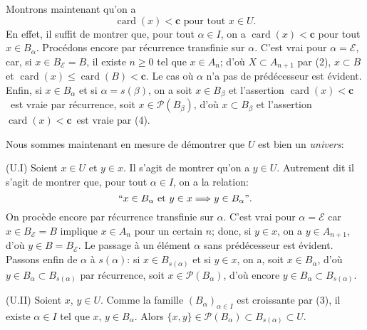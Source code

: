 \documentclass[12pt]{article}
\newcommand{\card}{\operatorname{card}}
\begin{document}
Montrons maintenant qu'on a
\begin{equation*}
\card(x) < \mathbf c\text{ pour tout } x\in U.\tag{5}
\end{equation*}
En effet, il suffit de montrer que, pour tout $\alpha\in I$, on a \og$\card(x) < \mathbf c$ pour tout $x\in B_{\alpha}$\fg. Procédons encore par récurrence transfinie sur $\alpha$. C'est vrai pour $\alpha=\mathcal{E}$, car, si $x\in B_{\mathcal{E}}=B$, il existe $n\geq 0$ tel que $x\in A_n$; d'où $X \subset A_{n+1}$ par (2), $x\subset B$ et $\card(x) \leq \card(B) < \mathbf c$. Le cas où $\alpha$ n'a pas de prédécesseur est évident. Enfin, si $x\in B_{\alpha}$ et si $\alpha=s(\beta)$, on a soit $x\in B_{\beta}$ et l'assertion \og$\card(x) < \mathbf c$\fg\ est vraie par récurrence, soit $x\in\mathcal{P}(B_{\beta})$, d'où $x\subset B_{\beta}$ et l'assertion \og$\card(x) < \mathbf c$\fg\ est vraie par (4).

Nous sommes maintenant en mesure de démontrer que $U$ est bien un \emph{univers}:

(U.I) Soient $x\in U$ et $y\in x$. Il s'agit de montrer qu'on a $y\in U$. Autrement dit il s'agit de montrer que, pour tout $\alpha\in I$, on a la relation:
$$
``x\in B_{\alpha}\text{ et } y\in x\Longrightarrow y\in B_{\alpha}\text{''}.
$$
On procède encore par récurrence transfinie sur $\alpha$. C'est vrai pour $\alpha =\mathcal{E}$ car $x\in B_{\mathcal{E}}=B$ implique $x\in A_n$ pour un certain $n$; donc, si $y\in x$, on a $y\in A_{n+1}$, d'où $y\in B=B_{\mathcal{E}}$. Le passage à un élément $\alpha$ sans prédécesseur est évident. Passons enfin de $\alpha$ à $s(\alpha)$: si $x\in B_{s(\alpha)}$ et si $y\in x$, on a, soit $x\in B_{\alpha}$, d'où $y\in B_{\alpha}\subset B_{s(\alpha)}$ par récurrence, soit $x\in \mathcal{P}(B_{\alpha})$, d'où encore $y\in B_{\alpha}\subset B_{s(\alpha)}$.

(U.II) Soient $x$, $y\in U$. Comme la famille $(B_{\alpha})_{\alpha\in I}$ est croissante par (3), il existe $\alpha\in I$ tel que $x$, $y\in B_{\alpha}$. Alors $\{x,y\}\in\mathcal{P}(B_{\alpha})\subset B_{s(\alpha)}\subset U$.
\end{document}
